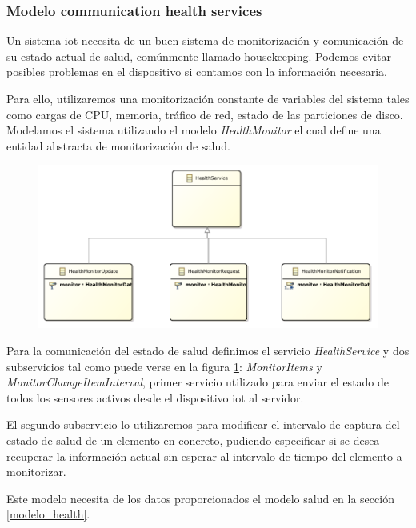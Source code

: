 \subsubsection{Modelo communication health services}
\label{modelo_communication_health_services}

Un sistema \gls{iot} necesita de un buen sistema de monitorización y comunicación de su estado actual de salud, comúnmente llamado \gls{housekeeping}. Podemos evitar posibles problemas en el dispositivo si contamos con la información necesaria.

Para ello, utilizaremos una monitorización constante de variables del sistema tales como cargas de CPU, memoria, tráfico de red, estado de las particiones de disco.
Modelamos el sistema utilizando el modelo \textit{HealthMonitor} el cual define una entidad abstracta de monitorización de salud.

\begin{figure}[ht]
	\centering
    \includegraphics[height=0.3\textheight]{images/models/communicationshealths_class_diagram.pdf}
    \label{fig:modelo_servicios_comunicacion_health_classes}
\end{figure}

Para la comunicación del estado de salud definimos el servicio \textit{HealthService} y dos subservicios tal como puede verse en la figura \ref{fig:modelo_servicios_comunicacion_health_classes}: \textit{MonitorItems} y \textit{MonitorChangeItemInterval}, primer servicio utilizado para enviar el estado de todos los sensores activos desde el dispositivo \gls{iot} al servidor.

El segundo subservicio lo utilizaremos para modificar el intervalo de captura del estado de salud de un elemento en concreto, pudiendo especificar si se desea recuperar la información actual sin esperar al intervalo de tiempo del elemento a monitorizar.

Este modelo necesita de los datos proporcionados el modelo salud en la sección \ref{modelo_health}.
